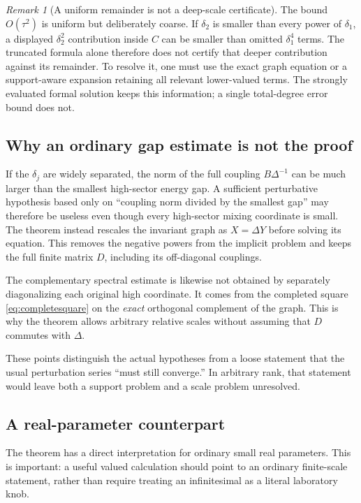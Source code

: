 \documentclass[11pt,oneside]{article}
\numberwithin{equation}{section}
\theoremstyle{plain}
\theoremstyle{definition}
\theoremstyle{remark}
\newtheorem{remark}[theorem]{Remark}
\begin{document}
\begin{remark}[A uniform remainder is not a deep-scale certificate]
The bound $O(\tau^2)$ is uniform but deliberately coarse. If $\delta_2$ is smaller than every power of $\delta_1$, a displayed $\delta_2^2$ contribution inside $C$ can be smaller than omitted $\delta_1^4$ terms. The truncated formula alone therefore does not certify that deeper contribution against its remainder. To resolve it, one must use the exact graph equation or a support-aware expansion retaining all relevant lower-valued terms. The strongly evaluated formal solution keeps this information; a single total-degree error bound does not.
\end{remark}

\subsection{Why an ordinary gap estimate is not the proof}
If the $\delta_j$ are widely separated, the norm of the full coupling $B\Delta^{-1}$ can be much larger than the smallest high-sector energy gap. A sufficient perturbative hypothesis based only on ``coupling norm divided by the smallest gap'' may therefore be useless even though every high-sector mixing coordinate is small. The theorem instead rescales the invariant graph as $X=\Delta Y$ before solving its equation. This removes the negative powers from the implicit problem and keeps the full finite matrix $D$, including its off-diagonal couplings.

The complementary spectral estimate is likewise not obtained by separately diagonalizing each original high coordinate. It comes from the completed square \eqref{eq:completesquare} on the \emph{exact} orthogonal complement of the graph. This is why the theorem allows arbitrary relative scales without assuming that $D$ commutes with $\Delta$.

These points distinguish the actual hypotheses from a loose statement that the usual perturbation series ``must still converge.'' In arbitrary rank, that statement would leave both a support problem and a scale problem unresolved.

\subsection{A real-parameter counterpart}
The theorem has a direct interpretation for ordinary small real parameters. This is important: a useful valued calculation should point to an ordinary finite-scale statement, rather than require treating an infinitesimal as a literal laboratory knob.
\end{document}
